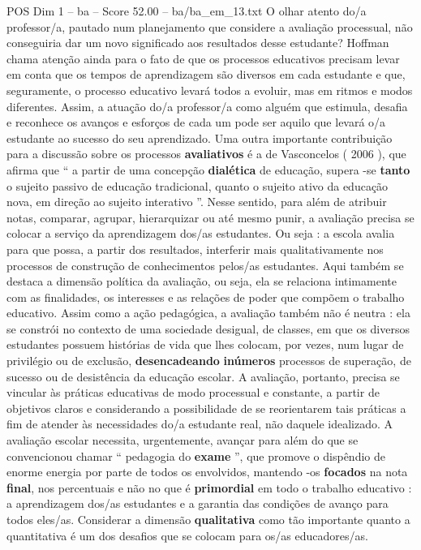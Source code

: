 \begin{textsample}{POS Dim 1 – ba – Score 52.00 – ba/ba\_em\_13.txt}
O olhar atento do/a professor/a, pautado num planejamento que considere a avaliação processual, não conseguiria dar um novo significado aos resultados desse estudante?
Hoffman chama atenção ainda para o fato de que os processos educativos precisam levar em conta que os tempos de aprendizagem são diversos em cada estudante e que, seguramente, o processo educativo levará todos a evoluir, mas em ritmos e modos diferentes.
Assim, a atuação do/a professor/a como alguém que estimula, desafia e reconhece os avanços e esforços de cada um pode ser aquilo que levará o/a estudante ao sucesso do seu aprendizado.
Uma outra importante contribuição para a discussão sobre os processos \textbf{avaliativos} é a de Vasconcelos ( 2006 ), que afirma que “ a partir de uma concepção \textbf{dialética} de educação, supera -se \textbf{tanto} o sujeito passivo de educação tradicional, quanto o sujeito ativo da educação nova, em direção ao sujeito interativo ”.
Nesse sentido, para além de atribuir notas, comparar, agrupar, hierarquizar ou até mesmo punir, a avaliação precisa se colocar a serviço da aprendizagem dos/as estudantes.
Ou seja : a escola avalia para que possa, a partir dos resultados, interferir mais qualitativamente nos processos de construção de conhecimentos pelos/as estudantes.
Aqui também se destaca a dimensão política da avaliação, ou seja, ela se relaciona intimamente com as finalidades, os interesses e as relações de poder que compõem o trabalho educativo.
Assim como a ação pedagógica, a avaliação também não é neutra : ela se constrói no contexto de uma sociedade desigual, de classes, em que os diversos estudantes possuem histórias de vida que lhes colocam, por vezes, num lugar de privilégio ou de exclusão, \textbf{desencadeando} \textbf{inúmeros} processos de superação, de sucesso ou de desistência da educação escolar.
A avaliação, portanto, precisa se vincular às práticas educativas de modo processual e constante, a partir de objetivos claros e considerando a possibilidade de se reorientarem tais práticas a fim de atender às necessidades do/a estudante real, não daquele idealizado.
A avaliação escolar necessita, urgentemente, avançar para além do que se convencionou chamar “ pedagogia do \textbf{exame} ”, que promove o dispêndio de enorme energia por parte de todos os envolvidos, mantendo -os \textbf{focados} na nota \textbf{final}, nos percentuais e não no que é \textbf{primordial} em todo o trabalho educativo : a aprendizagem dos/as estudantes e a garantia das condições de avanço para todos eles/as.
Considerar a dimensão \textbf{qualitativa} como tão importante quanto a quantitativa é um dos desafios que se colocam para os/as educadores/as.

\end{textsample}
